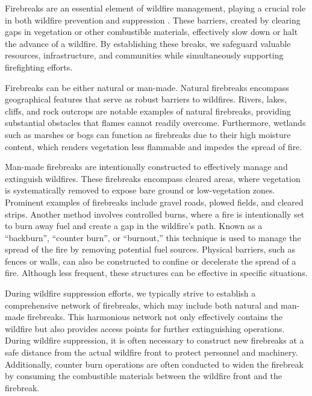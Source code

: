 \documentclass[
  12 pt,
]{Nemilov}
\begin{document}
Firebreaks are an essential element of wildfire management, playing a crucial role in both wildfire prevention and suppression \citep{ascoli2020firebreak, plucinski2019fighting}. These barriers, created by clearing gaps in vegetation or other combustible materials, effectively slow down or halt the advance of a wildfire. By establishing these breaks, we safeguard valuable resources, infrastructure, and communities while simultaneously supporting firefighting efforts.

Firebreaks can be either natural or man-made. Natural firebreaks encompass geographical features that serve as robust barriers to wildfires. Rivers, lakes, cliffs, and rock outcrops are notable examples of natural firebreaks, providing substantial obstacles that flames cannot readily overcome. Furthermore, wetlands such as marshes or bogs can function as firebreaks due to their high moisture content, which renders vegetation less flammable and impedes the spread of fire.

Man-made firebreaks are intentionally constructed to effectively manage and extinguish wildfires. These firebreaks encompass cleared areas, where vegetation is systematically removed to expose bare ground or low-vegetation zones. Prominent examples of firebreaks include gravel roads, plowed fields, and cleared strips. Another method involves controlled burns, where a fire is intentionally set to burn away fuel and create a gap in the wildfire's path. Known as a ``backburn'', ``counter burn'', or ``burnout,'' this technique is used to manage the spread of the fire by removing potential fuel sources. Physical barriers, such as fences or walls, can also be constructed to confine or decelerate the spread of a fire. Although less frequent, these structures can be effective in specific situations.

During wildfire suppression efforts, we typically strive to establish a comprehensive network of firebreaks, which may include both natural and man-made firebreaks. This harmonious network not only effectively contains the wildfire but also provides access points for further extinguishing operations. During wildfire suppression, it is often necessary to construct new firebreaks at a safe distance from the actual wildfire front to protect personnel and machinery. Additionally, counter burn operations are often conducted to widen the firebreak by consuming the combustible materials between the wildfire front and the firebreak.
\end{document}
